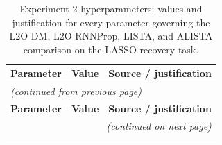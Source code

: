 %

\begin{longtable}{@{} l l p{7.6cm} @{}}
\caption{Experiment 2 hyperparameters: values and justification for every parameter governing the L2O-DM, L2O-RNNProp, LISTA, and ALISTA comparison on the LASSO recovery task.}
\label{tab:exp2-hyperparameters} \\
\toprule
\textbf{Parameter} & \textbf{Value} & \textbf{Source / justification} \\
\midrule
\endfirsthead

\multicolumn{3}{l}{\textit{(continued from previous page)}} \\
\toprule
\textbf{Parameter} & \textbf{Value} & \textbf{Source / justification} \\
\midrule
\endhead

\midrule
\multicolumn{3}{r}{\textit{(continued on next page)}} \\
\endfoot

\bottomrule
\endlastfoot


\end{longtable}

